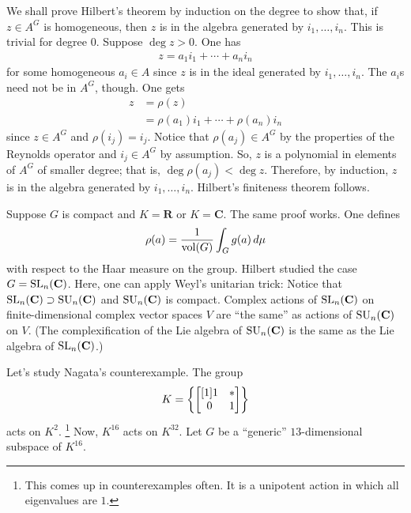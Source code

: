 \documentclass [11 pt, oneside] {article}
\begin{document}
We shall prove Hilbert's theorem by induction on the degree to show that, if $z\in A^G$ is homogeneous, then $z$ is in the algebra generated by $i_1,\hdots,i_n$. This is trivial for degree $0$. Suppose $\deg z > 0$. One has
\begin{align*}
	z=a_1i_1 + \cdots +a_ni_n
\end{align*}
for some homogeneous $a_i\in A$ since $z$ is in the ideal generated by $i_1,\hdots, i_n$. The $a_i$s need not be in $A^G$, though. One gets
\begin{align*}
	z &= \rho(z)\\ 
	  &= \rho(a_1)i_1 + \cdots +\rho(a_n)i_n
\end{align*}
since $z\in A^G$ and $\rho(i_j)=i_j$. Notice that $\rho(a_j) \in A^G$ by the properties of the Reynolds operator and $i_j\in A^G$ by assumption. So, $z$ is a polynomial in elements of $A^G$ of smaller degree; that is, $\deg \rho(a_j)<\deg z$. Therefore, by induction, $z$ is in the algebra generated by $i_1,\hdots, i_n$. Hilbert's finiteness theorem follows.

Suppose $G$ is compact and $K=\mathbf{R}$ or $K=\mathbf{C}$. The same proof works. One defines 
\begin{align*}
	\rho(a) = \frac{1}{\operatorname{vol} (G)}\int_{G}^{} g(a) \, d\mu
\end{align*}		
with respect to the Haar measure on the group. Hilbert studied the case $G=\operatorname{SL}_{n}(\mathbf{C})$. Here, one can apply Weyl's unitarian trick: Notice that $\operatorname{SL}_{n}(\mathbf{C})\supset \operatorname{SU}_n(\mathbf{C})$ and $\operatorname{SU}_n(\mathbf{C})$ is compact. Complex actions of $\operatorname{SL}_{n}(\mathbf{C})$ on finite-dimensional complex vector spaces $V$ are ``the same'' as actions of $\operatorname{SU}_n(\mathbf{C})$ on $V$. (The complexification of the Lie algebra of $\operatorname{SU}_n(\mathbf{C})$ is the same as the Lie algebra of $\operatorname{SL}_{n}(\mathbf{C})$.) 

Let's study Nagata's counterexample. The group
\begin{align*}
	K = \left\{ \begin{bmatrix} [1] 1&*\\0&1\end{bmatrix} \right\} 
\end{align*}
acts on $K^2$. \footnote{This comes up in counterexamples often. It is a unipotent action in which all eigenvalues are $1$.} Now, $K^{16}$ acts on $K^{32}$. Let $G$ be a ``generic'' $13$-dimensional subspace of $K^{16}$. 
\end{document}
